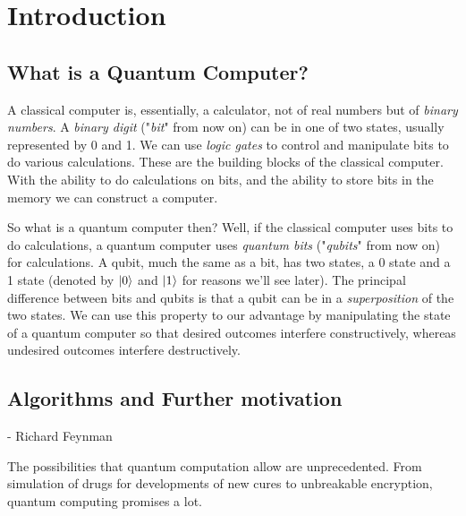 \chapter{Introduction}
\section{What is a Quantum Computer?}
 A classical computer is, essentially, a calculator, not of real numbers but of \textit{binary numbers}. A \textit{binary digit} ("\textit{bit}" from now on) can be in one of two states, usually represented by 0 and 1. We can use \textit{logic gates} to control and manipulate bits to do various calculations. These are the building blocks of the classical computer. With the ability to do calculations on bits, and the ability to store bits in the memory we can construct a computer.
 
So what is a quantum computer then? Well, if the classical computer uses bits to do calculations, a quantum computer uses \textit{quantum bits} ("\textit{qubits}" from now on) for calculations. A qubit, much the same as a bit, has two states, a 0 state and a 1 state (denoted by $\ket{0}$ and $\ket{1}$ for reasons we'll see later). The principal difference between bits and qubits is that a qubit can be in a \textit{superposition} of the two states. We can use this property to our advantage by manipulating the state of a quantum computer so that desired outcomes interfere constructively, whereas undesired outcomes interfere destructively.

\section{Algorithms and Further motivation}
 \begin{quotation}
 \end{quotation}
\centerline{- Richard Feynman}
The possibilities that quantum computation allow are unprecedented. From simulation of drugs for developments of new cures to unbreakable encryption, quantum computing promises a lot. 


